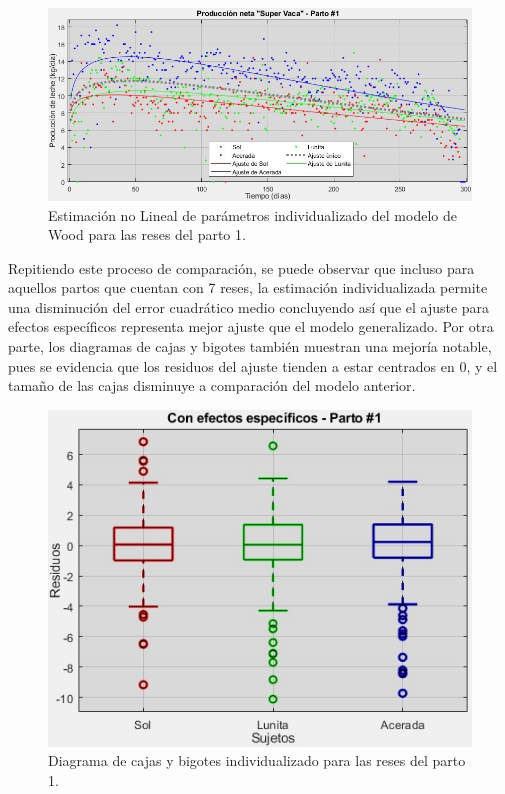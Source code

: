 \begin{figure}[H]
	 \begin{center}
	 \includegraphics[scale=0.69]{img/nlinfitmultiplespa.jpg}
	 \end{center}
	 \caption{Estimación no Lineal de parámetros individualizado del modelo de Wood para las reses del parto 1. \label{nlinfitmultiplepng}}
\end{figure}

Repitiendo este proceso de comparación, se puede observar que incluso para aquellos partos que cuentan con 7 reses, la estimación individualizada permite una disminución del  error cuadrático medio concluyendo así que el ajuste para efectos específicos representa mejor ajuste que el modelo generalizado. Por otra parte, los diagramas de cajas y bigotes también muestran una mejoría notable, pues se evidencia que los residuos del ajuste tienden a estar centrados en 0, y el tamaño de las cajas disminuye a comparación del modelo anterior.

\begin{figure}[H]
	 \begin{center}
	 \includegraphics[scale=0.9]{img/nlinfitboxmultiplespa.jpg}
	 \end{center}
	 \caption{Diagrama de cajas y bigotes individualizado para las reses del parto 1. \label{nlinfitbox1png}}
\end{figure}

